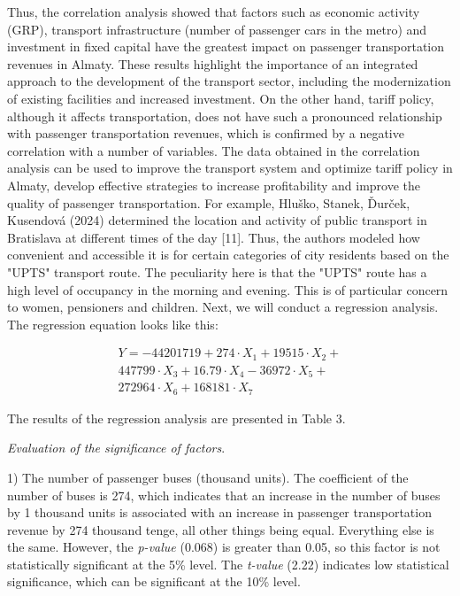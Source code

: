 \begin{multicols}{2}
Thus, the correlation analysis showed that factors such as economic
activity (GRP), transport infrastructure (number of passenger cars in
the metro) and investment in fixed capital have the greatest impact on
passenger transportation revenues in Almaty. These results highlight the
importance of an integrated approach to the development of the transport
sector, including the modernization of existing facilities and increased
investment. On the other hand, tariff policy, although it affects
transportation, does not have such a pronounced relationship with
passenger transportation revenues, which is confirmed by a negative
correlation with a number of variables. The data obtained in the
correlation analysis can be used to improve the transport system and
optimize tariff policy in Almaty, develop effective strategies to
increase profitability and improve the quality of passenger
transportation. For example, Hluško, Stanek, Ďurček, Kusendová (2024)
determined the location and activity of public transport in Bratislava
at different times of the day {[}11{]}. Thus, the authors modeled how
convenient and accessible it is for certain categories of city residents
based on the "UPTS" transport route. The peculiarity here is that the
"UPTS" route has a high level of occupancy in the morning and evening.
This is of particular concern to women, pensioners and children. Next,
we will conduct a regression analysis. The regression equation looks
like this:

\begin{equation*}
\begin{aligned}
    Y = -44201719 + 274 \cdot X_1 + 19515 \cdot X_2 + \\
    447799 \cdot X_3 + 16.79 \cdot X_4 - 36972 \cdot X_5 + \\
    272964 \cdot X_6 + 168181 \cdot X_7
\end{aligned}
\end{equation*}

The results of the regression analysis are presented in Table 3.

\emph{Evaluation of the significance of factors}.

1) The number of passenger buses (thousand units). The coefficient of
the number of buses is 274, which indicates that an increase in the
number of buses by 1 thousand units is associated with an increase in
passenger transportation revenue by 274 thousand tenge, all other things
being equal. Everything else is the same. However, the \emph{p-value}
(0.068) is greater than 0.05, so this factor is not statistically
significant at the 5\% level. The \emph{t-value} (2.22) indicates low
statistical significance, which can be significant at the 10\% level.


\end{multicols}

